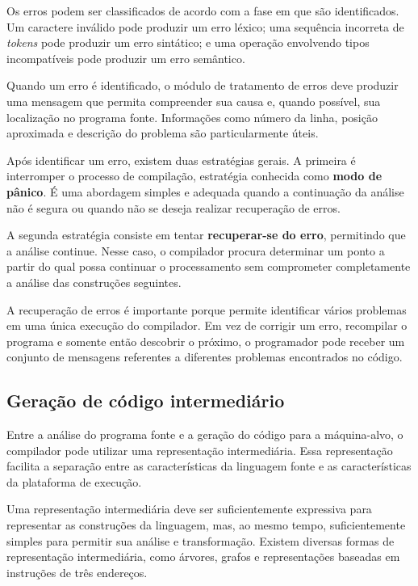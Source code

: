 \documentclass[
  brazilian,
  letterpaper,
]{book}
\theoremstyle{plain}
\theoremstyle{definition}
\theoremstyle{remark}
\begin{document}
Os erros podem ser classificados de acordo com a fase em que são
identificados. Um caractere inválido pode produzir um erro léxico; uma
sequência incorreta de \emph{tokens} pode produzir um erro sintático; e
uma operação envolvendo tipos incompatíveis pode produzir um erro
semântico.

Quando um erro é identificado, o módulo de tratamento de erros deve
produzir uma mensagem que permita compreender sua causa e, quando
possível, sua localização no programa fonte. Informações como número da
linha, posição aproximada e descrição do problema são particularmente
úteis.

Após identificar um erro, existem duas estratégias gerais. A primeira é
interromper o processo de compilação, estratégia conhecida como
\textbf{modo de pânico}. É uma abordagem simples e adequada quando a
continuação da análise não é segura ou quando não se deseja realizar
recuperação de erros.

A segunda estratégia consiste em tentar \textbf{recuperar-se do erro},
permitindo que a análise continue. Nesse caso, o compilador procura
determinar um ponto a partir do qual possa continuar o processamento sem
comprometer completamente a análise das construções seguintes.

A recuperação de erros é importante porque permite identificar vários
problemas em uma única execução do compilador. Em vez de corrigir um
erro, recompilar o programa e somente então descobrir o próximo, o
programador pode receber um conjunto de mensagens referentes a
diferentes problemas encontrados no código.

\subsection{Geração de código
intermediário}\label{gerauxe7uxe3o-de-cuxf3digo-intermediuxe1rio}

Entre a análise do programa fonte e a geração do código para a
máquina-alvo, o compilador pode utilizar uma representação
intermediária. Essa representação facilita a separação entre as
características da linguagem fonte e as características da plataforma de
execução.

Uma representação intermediária deve ser suficientemente expressiva para
representar as construções da linguagem, mas, ao mesmo tempo,
suficientemente simples para permitir sua análise e transformação.
Existem diversas formas de representação intermediária, como árvores,
grafos e representações baseadas em instruções de três endereços.
\end{document}
